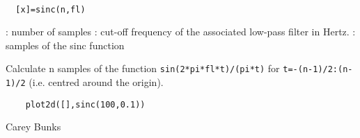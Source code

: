 
\begin{mandesc}
   \\ %
\end{mandesc}
\begin{calling_sequence}
\begin{verbatim}
  [x]=sinc(n,fl)  
\end{verbatim}
\end{calling_sequence}
\begin{parameters}
  \begin{varlist}
    : number of samples
    : cut-off frequency of the associated low-pass filter in Hertz.
    : samples of the sinc function
  \end{varlist}
\end{parameters}
\begin{mandescription}
  Calculate n samples of the function \verb!sin(2*pi*fl*t)/(pi*t)!
  for \verb!t=-(n-1)/2:(n-1)/2! (i.e. centred around the origin).
\end{mandescription}
\begin{examples}
  \begin{Verbatim}
    plot2d([],sinc(100,0.1))
  \end{Verbatim}
\end{examples}
\begin{manseealso}
\end{manseealso}
\begin{authors}
  Carey Bunks
\end{authors}
